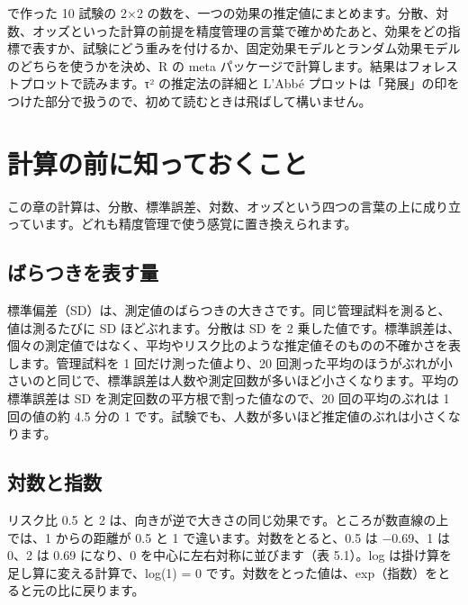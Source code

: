 \begin{chapintro}
 で作った 10 試験の 2×2 の数を、一つの効果の推定値にまとめます。分散、対数、オッズといった計算の前提を精度管理の言葉で確かめたあと、効果をどの指標で表すか、試験にどう重みを付けるか、固定効果モデルとランダム効果モデルのどちらを使うかを決め、R の meta パッケージで計算します。結果はフォレストプロットで読みます。τ² の推定法の詳細と L'Abbé プロットは「発展」の印をつけた部分で扱うので、初めて読むときは飛ばして構いません。
\end{chapintro}

\section{計算の前に知っておくこと}
\label{sec:05-1}

この章の計算は、分散、標準誤差、対数、オッズという四つの言葉の上に成り立っています。どれも精度管理で使う感覚に置き換えられます。

\subsection{ばらつきを表す量}
\label{sec:05-1-1}

標準偏差（SD）は、測定値のばらつきの大きさです。同じ管理試料を測ると、値は測るたびに SD ほどぶれます。分散は SD を 2 乗した値です。標準誤差は、個々の測定値ではなく、平均やリスク比のような推定値そのものの不確かさを表します。管理試料を 1 回だけ測った値より、20 回測った平均のほうがぶれが小さいのと同じで、標準誤差は人数や測定回数が多いほど小さくなります。平均の標準誤差は SD を測定回数の平方根で割った値なので、20 回の平均のぶれは 1 回の値の約 4.5 分の 1 です。試験でも、人数が多いほど推定値のぶれは小さくなります。

\subsection{対数と指数}
\label{sec:05-1-2}

リスク比 0.5 と 2 は、向きが逆で大きさの同じ効果です。ところが数直線の上では、1 からの距離が 0.5 と 1 で違います。対数をとると、0.5 は \mbox{−0.69}、1 は 0、2 は 0.69 になり、0 を中心に左右対称に並びます（表 5.1）。log は掛け算を足し算に変える計算で、log(1) = 0 です。対数をとった値は、exp（指数）をとると元の比に戻ります。

\begin{kkcenter}
\end{kkcenter}

